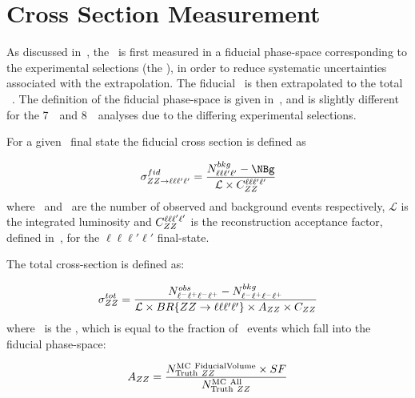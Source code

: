 \section{Cross Section Measurement}

As discussed in~\sec{}, the \cx\ is first measured in a fiducial phase-space
corresponding to the experimental selections (the ), in
order to reduce systematic uncertainties associated with the extrapolation. The
fiducial \cx\ is then extrapolated to the total \ZZ\ \cx. The definition of the
fiducial phase-space is given in~\sec{}, and is slightly different for the
7~\tev\ and 8~\tev\ analyses due to the differing experimental selections.

For a given \ZZllll\ final state the fiducial cross section is defined as

\begin{equation}\label{eq:xsecfid_fourl}
\sigma_{\zzllll}^{fid} = \frac{
 \NObs - \NBg}{\mathcal{L} \times
\CZZ^{\ell\ell\ell'\ell'}}
\end{equation}
where \NObs\ and \NBg\ are the number of observed and
background events respectively, $\mathcal{L}$ is the integrated luminosity and
$C_{ZZ}^{\ell\ell\ell'\ell'}$ is the reconstruction acceptance factor, defined
in~, for the $\ell\ell\ell'\ell'$ final-state.  

The total cross-section is defined as:

\begin{equation}\label{eq:xsectot_fourl}
\sigma_{ZZ}^{tot} = \frac{ N^{obs}_{\ell^{-}\ell^{+}\ell^{-}\ell^{+}} - N^{bkg}_{\ell^{-}\ell^{+}\ell^{-}\ell^{+}}}{\mathcal{L} \times
BR\{ZZ\rightarrow\ell\ell\ell'\ell'\} \times A_{ZZ} \times C_{ZZ}}
\end{equation}
where \AZZ\ is the , which is equal to the
fraction of \ZZ\ events which fall into the fiducial phase-space:

\begin{equation}
A_{ZZ} = \frac{ N^{\rm MC\ Fiducial Volume}_{{\rm Truth}\ ZZ} \times
SF }{ N^{{\rm MC\ All}}_{{\rm Truth}\ ZZ} }
\end{equation}


